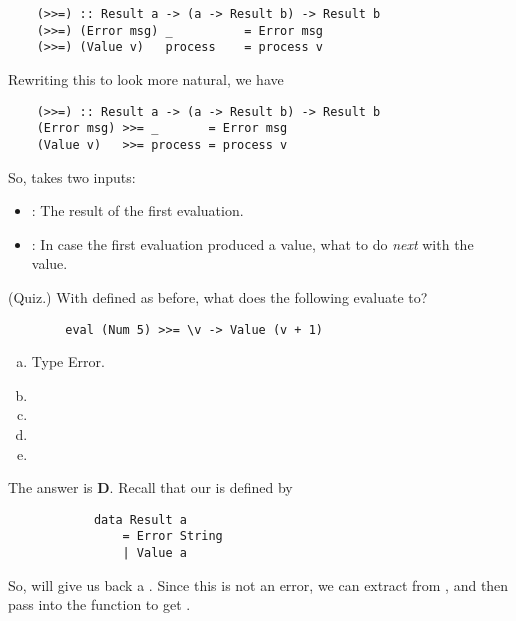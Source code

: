 \documentclass[letterpaper]{article}
\begin{document}
\begin{verbatim}
    (>>=) :: Result a -> (a -> Result b) -> Result b 
    (>>=) (Error msg) _          = Error msg 
    (>>=) (Value v)   process    = process v\end{verbatim}
Rewriting this to look more natural, we have 
\begin{verbatim}
    (>>=) :: Result a -> (a -> Result b) -> Result b
    (Error msg) >>= _       = Error msg
    (Value v)   >>= process = process v\end{verbatim}
So, \code{>>=} takes two inputs: 
\begin{itemize}
    \item {}: The result of the first evaluation.
    \item {}: In case the first evaluation produced a value, what to do \emph{next} with the value.
\end{itemize}

\begin{mdframed}
    (Quiz.) With \code{>>=} defined as before, what does the following evaluate to? 
    \begin{verbatim}
        eval (Num 5) >>= \v -> Value (v + 1)\end{verbatim}

    \begin{enumerate}[(a)]
        \item Type Error. 
        \item {}
        \item {}
        \item {}
        \item {}
    \end{enumerate}

    \begin{mdframed}
        The answer is \textbf{D}. Recall that our  is defined by 
        \begin{verbatim}
            data Result a
                = Error String 
                | Value a\end{verbatim}
        So,  will give us back a . Since this is not an error, we can extract  from , and then pass  into the function to get .
    \end{mdframed}
\end{mdframed}
\end{document}
